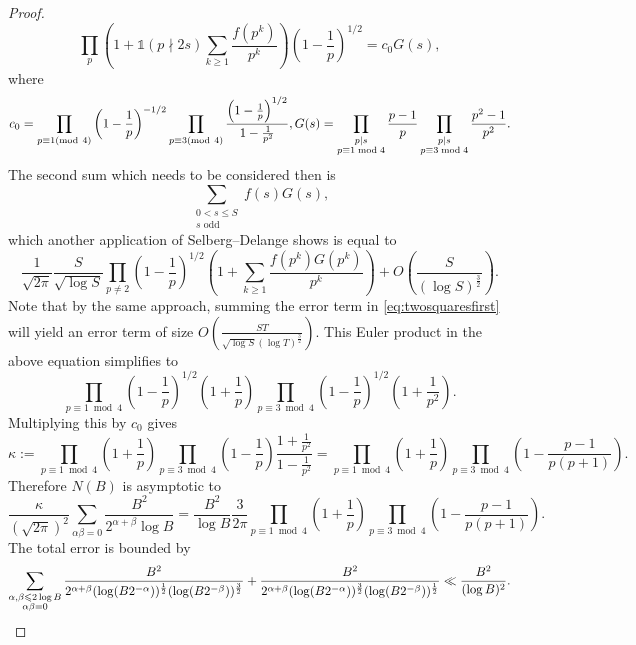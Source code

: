 \documentclass[a4paper,12pt,reqno]{amsart}
\numberwithin{equation}{section} \numberwithin{figure}{section}
\newcommand{\md}[1]{  \left(\textnormal{mod}\ #1\right)}
\renewcommand{\l}{\left}
\renewcommand{\r}{\right}
\renewcommand{\leq}{\leqslant}
\renewcommand{\geq}{\geqslant}
\renewcommand{\#}{\sharp}
\newcommand{\p}{\mathfrak{p}}
\theoremstyle{definition}
\numberwithin{lemma}{section}
\begin{document}
\begin{proof}
\[\prod_{p   } \l(1+\mathds 1 (p\nmid 2s)
\sum_{k\geq 1 } \frac{f(p^k ) }{p^k}\r) \l(1-\frac{1}{p } \r)^{1/2} = c_0 G(s)  ,\] 
%    
    where  
$$
c_0 =
  \prod_{\substack{ p\equiv 1 \md 4 } } 
 \l(1-\frac{1}{p } \r)^{-1/2}   \prod_{\substack{ p\equiv 3 \md 4 } } 
\frac{\l(1-\frac{1}{p } \r)^{1/2} }{1-\frac{1}{p^2 } }
,
G(s) = \prod_{\substack{p \mid s\\ p \equiv 1 \bmod 4}} \frac{p-1}{p} \prod_{\substack{p \mid s \\ p \equiv 3 \bmod 4}} \frac{p^2-1}{p^2}.
$$
 The second sum which needs to be considered then is
\[
\sum_{\substack{0<s \leq S \\ s \text{ odd}}} f(s) G(s),
\]
which another application of Selberg--Delange shows is equal to 
\[
\frac{1}{\sqrt{2\pi}} \frac{S}{\sqrt{\log S}} \prod_{p \neq 2} \left(1 - \frac{1}{p}\right)^{1/2} \left( 1 + \sum_{k \geq 1} \frac{f(p^k)G(p^k)}{p^k}\right)
+ O\left( \frac{S}{(\log S)^{\frac{3}{2}}} \right).
\]
Note that by the same approach, summing the error term in \eqref{eq:twosquaresfirst} will yield an error term of size $O\left( \frac{ST}{\sqrt{\log S} (\log T)^{\frac{3}{2}}} \right).$
This Euler product in the above equation simplifies to
\[
\prod_{ p \equiv 1 \bmod 4} \left( 1- \frac{1}{p}\right)^{1/2} \left( 1 + \frac{1}{p}\right)
\prod_{ p \equiv 3 \bmod 4} \left( 1- \frac{1}{p}\right)^{1/2} \left( 1 +  \frac{1}{p^2}\right)
.
\]
Multiplying this by $c_0$ gives 
\[
\kappa :=
 \prod_{ p \equiv 1 \bmod 4}   \left( 1 + \frac{1}{p}\right)
 \prod_{p \equiv 3 \bmod 4} \left(1 - \frac{1}{p}\right) 
\frac{1+\frac{1}{p^2} }{1-\frac{1}{p^2} }
=
\prod_{p \equiv 1 \bmod 4} \left(1 + \frac{1}{p} \right)
\prod_{p \equiv 3 \bmod 4} \left( 1 - \frac{p-1}{p(p+1)}\right).
\]
Therefore $N(B)$ is asymptotic to
\[
\frac{ \kappa}{(\sqrt{2 \pi})^2 }
\sum_{\alpha \beta =0}  \frac{B^2}{2^{\alpha + \beta}\log B} =  
\frac{B^2}{\log B} \frac{3}{2\pi}
\prod_{p \equiv 1 \bmod 4} \left(1 + \frac{1}{p} \right)
\prod_{p \equiv 3 \bmod 4} \left( 1 - \frac{p-1}{p(p+1)}\right)
. 
\]
The total error is bounded by
\[
\sum_{\substack{ \alpha, \beta \leq 2 \log B\\ \alpha\beta =0}}
 \frac{B^2}{2^{\alpha+ \beta}(\log(B 2^{-\alpha}))^{\frac{1}{2}}(\log(B 2^{-\beta}))^{\frac{3}{2}} }
 +
  \frac{B^2}{2^{\alpha+ \beta}(\log(B 2^{-\alpha}))^{\frac{3}{2}}(\log(B 2^{-\beta}))^{\frac{1}{2}} }
  \ll \frac{B^2}{(\log B)^2}. \qedhere
\]
\end{proof} 
\end{document}
